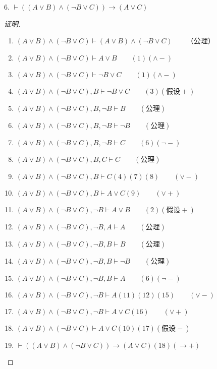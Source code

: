 \documentclass{article}
\begin{document}
\begin{CJK*}{UTF8}{gbsn}
    
    
    6. $\vdash ((A\lor B)\land (\lnot B\lor C))\to (A\lor C)$
    
    \begin{proof}[证明]
      
      $\quad$

      \begin{enumerate}
        \item $(A\lor B)\land (\lnot B\lor C)\vdash (A\lor B)\land (\lnot B\lor C)\qquad$（公理）
        \item $(A\lor B)\land (\lnot B\lor C)\vdash A\lor B\qquad(1)(\land -)$
        \item $(A\lor B)\land (\lnot B\lor C)\vdash \lnot B\lor C\qquad(1)(\land -)$
        \item $(A\lor B)\land (\lnot B\lor C), B\vdash \lnot B\lor C\qquad(3)(\text{假设} +)$
        \item $(A\lor B)\land (\lnot B\lor C), B, \lnot B\vdash B\qquad(\text{公理})$
        \item $(A\lor B)\land (\lnot B\lor C), B, \lnot B\vdash \lnot B\qquad(\text{公理})$
        \item $(A\lor B)\land (\lnot B\lor C), B, \lnot B\vdash C\qquad(6)(\lnot -)$
        \item $(A\lor B)\land (\lnot B\lor C), B, C\vdash C\qquad(\text{公理})$
        \item $(A\lor B)\land (\lnot B\lor C), B\vdash C(4)(7)(8)\qquad(\lor -)$
        \item $(A\lor B)\land (\lnot B\lor C), B\vdash A\lor C(9)\qquad(\lor +)$
        \item $(A\lor B)\land (\lnot B\lor C), \lnot B\vdash A\lor B\qquad(2)(\text{假设} +)$
        \item $(A\lor B)\land (\lnot B\lor C), \lnot B, A\vdash A\qquad(\text{公理})$
        \item $(A\lor B)\land (\lnot B\lor C), \lnot B, B\vdash B\qquad(\text{公理})$
        \item $(A\lor B)\land (\lnot B\lor C), \lnot B, B\vdash \lnot B\qquad(\text{公理})$
        \item $(A\lor B)\land (\lnot B\lor C), \lnot B, B\vdash A\qquad(6)(\lnot -)$
        \item $(A\lor B)\land (\lnot B\lor C), \lnot B\vdash A(11)(12)(15)\qquad(\lor -)$
        \item $(A\lor B)\land (\lnot B\lor C), \lnot B\vdash A\lor C(16)\qquad(\lor +)$
        \item $(A\lor B)\land (\lnot B\lor C)\vdash A\lor C(10)(17)(\text{假设}-)$
        \item $\vdash ((A\lor B)\land (\lnot B\lor C))\to (A\lor C)(18)(\to +)$
      \end{enumerate}


\end{proof}
\end{CJK*}
\end{document}
